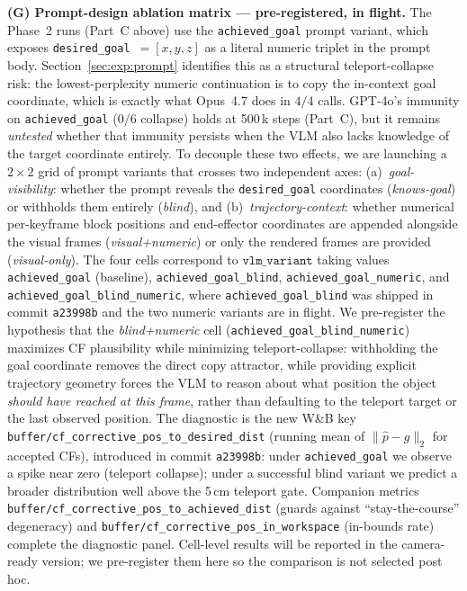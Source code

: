 \documentclass{article}
\begin{document}
\textbf{(G) Prompt-design ablation matrix --- pre-registered, in flight.}
The Phase~2 runs (Part~C above) use the \texttt{achieved\_goal} prompt variant,
which exposes \texttt{desired\_goal}~$= [x,y,z]$ as a literal numeric triplet
in the prompt body.
Section~\ref{sec:exp:prompt} identifies this as a structural teleport-collapse
risk: the lowest-perplexity numeric continuation is to copy the in-context goal
coordinate, which is exactly what Opus~4.7 does in $4/4$ calls.
GPT-4o's immunity on \texttt{achieved\_goal} (0/6 collapse) holds at 500\,k
steps (Part~C), but it remains \emph{untested} whether that immunity persists
when the VLM also lacks knowledge of the target coordinate entirely.
To decouple these two effects, we are launching a $2\!\times\!2$ grid of prompt
variants that crosses two independent axes:
(a)~\emph{goal-visibility}: whether the prompt reveals the \texttt{desired\_goal}
coordinates (\emph{knows-goal}) or withholds them entirely (\emph{blind}), and
(b)~\emph{trajectory-context}: whether numerical per-keyframe block positions
and end-effector coordinates are appended alongside the visual frames
(\emph{visual+numeric}) or only the rendered frames are provided
(\emph{visual-only}).
The four cells correspond to $\mathtt{vlm\_variant}$ taking values
\texttt{achieved\_goal} (baseline),
\texttt{achieved\_goal\_blind},
\texttt{achieved\_goal\_numeric}, and
\texttt{achieved\_goal\_blind\_numeric},
where \texttt{achieved\_goal\_blind} was shipped in commit \texttt{a23998b} and
the two numeric variants are in flight.
We pre-register the hypothesis that the \emph{blind+numeric} cell
(\texttt{achieved\_goal\_blind\_numeric}) maximizes CF plausibility while
minimizing teleport-collapse: withholding the goal coordinate removes the
direct copy attractor, while providing explicit trajectory geometry forces the
VLM to reason about what position the object \emph{should have reached at this
frame}, rather than defaulting to the teleport target or the last observed position.
The diagnostic is the new W\&B key
\texttt{buffer/cf\_corrective\_pos\_to\_desired\_dist}
(running mean of $\|\hat{p} - g\|_2$ for accepted CFs), introduced in
commit \texttt{a23998b}: under \texttt{achieved\_goal} we observe a spike near
zero (teleport collapse); under a successful blind variant we predict a
broader distribution well above the 5\,cm teleport gate.
Companion metrics
\texttt{buffer/cf\_corrective\_pos\_to\_achieved\_dist} (guards against
``stay-the-course'' degeneracy) and
\texttt{buffer/cf\_corrective\_pos\_in\_workspace} (in-bounds rate) complete the
diagnostic panel. Cell-level results will be reported in the camera-ready version;
we pre-register them here so the comparison is not selected post hoc.
\end{document}
